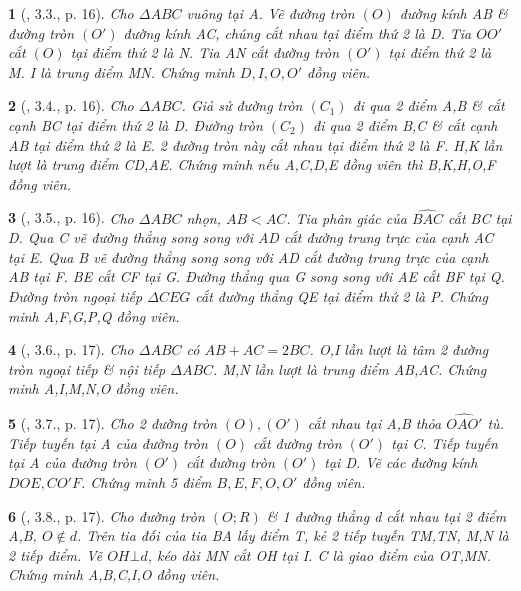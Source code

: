 \documentclass{article}
\newtheorem{baitoan}{}
\begin{document}
\begin{baitoan}[\cite{Thu_Chung_Viet_Minh_circ}, 3.3., p. 16]
	Cho $\Delta ABC$ vuông tại A. Vẽ đường tròn $(O)$ đường kính AB \& đường tròn $(O')$ đường kính AC, chúng cắt nhau tại điểm thứ 2 là D. Tia $OO'$ cắt $(O)$ tại điểm thứ 2 là N. Tia AN cắt đường tròn $(O')$ tại điểm thứ 2 là M. I là trung điểm MN. Chứng minh $D,I,O,O'$ đồng viên.
\end{baitoan}

\begin{baitoan}[\cite{Thu_Chung_Viet_Minh_circ}, 3.4., p. 16]
	Cho $\Delta ABC$. Giả sử đường tròn $(C_1)$ đi qua 2 điểm A,B \& cắt cạnh BC tại điểm thứ 2 là D. Đường tròn $(C_2)$ đi qua 2 điểm B,C \& cắt cạnh AB tại điểm thứ 2 là E. 2 đường tròn này cắt nhau tại điểm thứ 2 là F. H,K lần lượt là trung điểm CD,AE. Chứng minh nếu A,C,D,E đồng viên thì B,K,H,O,F đồng viên.
\end{baitoan}

\begin{baitoan}[\cite{Thu_Chung_Viet_Minh_circ}, 3.5., p. 16]
	Cho $\Delta ABC$ nhọn, $AB < AC$. Tia phân giác của $\widehat{BAC}$ cắt BC tại D. Qua C vẽ đường thẳng song song với AD cắt đường trung trực của cạnh AC tại E. Qua B vẽ đường thẳng song song với AD cắt đường trung trực của cạnh AB tại F. BE cắt CF tại G. Đường thẳng qua G song song với AE cắt BF tại Q. Đường tròn ngoại tiếp $\Delta CEG$ cắt đường thẳng QE tại điểm thứ 2 là P. Chứng minh A,F,G,P,Q đồng viên.
\end{baitoan}

\begin{baitoan}[\cite{Thu_Chung_Viet_Minh_circ}, 3.6., p. 17]
	Cho $\Delta ABC$ có $AB + AC = 2BC$. O,I lần lượt là tâm 2 đường tròn ngoại tiếp \& nội tiếp $\Delta ABC$. M,N lần lượt là trung điểm AB,AC. Chứng minh A,I,M,N,O đồng viên.
\end{baitoan}

\begin{baitoan}[\cite{Thu_Chung_Viet_Minh_circ}, 3.7., p. 17]
	Cho 2 đường tròn $(O),(O')$ cắt nhau tại A,B thỏa $\widehat{OAO'}$ tù. Tiếp tuyến tại A của đường tròn $(O)$ cắt đường tròn $(O')$ tại C. Tiếp tuyến tại A của đường tròn $(O')$ cắt đường tròn $(O')$ tại D. Vẽ các đường kính $DOE,CO'F$. Chứng minh 5 điểm $B,E,F,O,O'$ đồng viên.
\end{baitoan}

\begin{baitoan}[\cite{Thu_Chung_Viet_Minh_circ}, 3.8., p. 17]
	Cho đường tròn $(O;R)$ \& 1 đường thẳng d cắt nhau tại 2 điểm A,B, $O\notin d$. Trên tia đối của tia BA lấy điểm T, kẻ 2 tiếp tuyến TM,TN, M,N là 2 tiếp điểm. Vẽ $OH\bot d$, kéo dài MN cắt OH tại I. C là giao điểm của OT,MN. Chứng minh A,B,C,I,O đồng viên.
\end{baitoan}
\end{document}
